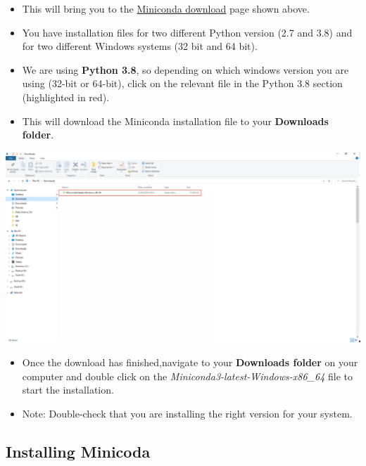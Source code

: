\documentclass[
]{book}
\providecommand{\tightlist}{%
  \setlength{\itemsep}{0pt}\setlength{\parskip}{0pt}}
\begin{document}
\begin{itemize}
\tightlist
\item
  This will bring you to the \href{https://docs.conda.io/en/latest/miniconda.html\#windows-installers}{Miniconda download} page shown above.
\item
  You have installation files for two different Python version (2.7 and 3.8) and for two different Windows systems (32 bit and 64 bit).
\item
  We are using \textbf{Python 3.8}, so depending on which windows version you are using (32-bit or 64-bit), click on the relevant file in the Python 3.8 section (highlighted in red).
\item
  This will download the Miniconda installation file to your \textbf{Downloads folder}.
\end{itemize}

\begin{center}\includegraphics[width=29.86in]{figs/chp4/Picture11} \end{center}

\begin{itemize}
\tightlist
\item
  Once the download has finished,navigate to your \textbf{Downloads folder} on your computer and double click on the \emph{Miniconda3-latest-Windows-x86\_64} file to start the installation.
\item
  Note: Double-check that you are installing the right version for your system.
\end{itemize}

\hypertarget{installing-minicoda}{%
\subsection*{Installing Minicoda}\label{installing-minicoda}}
\end{document}
